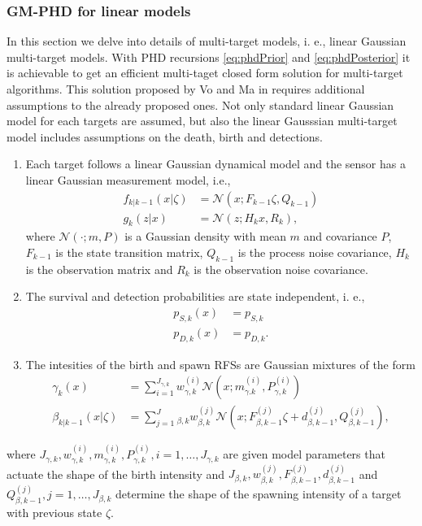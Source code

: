        \subsubsection{GM-PHD for linear models}
In this section we delve into details of multi-target models, i. e., linear Gaussian multi-target models. With PHD recursions \eqref{eq:phdPrior} and \eqref{eq:phdPosterior} it is achievable to get an efficient multi-taget closed form solution for multi-target algorithms. This solution proposed by Vo and Ma in \cite{VoMaPHD2006} requires additional assumptions to the already proposed ones. Not only standard linear Gaussian model for each targets are assumed, but also the linear Gausssian multi-target model includes assumptions on the death, birth and detections.
\begin{enumerate}[start=4]
    \item  Each target follows a linear Gaussian dynamical model and the sensor has a linear Gaussian measurement model, i.e., \label{as:phd_4}
        \begin{align}
            f_{k|k-1}(x|\zeta) &= \mathcal{N}(x; F_{k-1}\zeta, Q_{k-1}) \\
            g_k(z|x) &= \mathcal{N}(z;H_kx, R_k),
        \end{align}
        where $\mathcal{N}(\cdot;m,P)$ is a Gaussian density with mean $m$ and covariance $P$, $F_{k-1}$ is the state transition matrix, $Q_{k-1}$ is the process noise covariance, $H_k$ is the observation matrix and $R_k$ is the observation noise covariance.
    \item The survival and detection probabilities are state independent, i. e., \label{as:phd_5}
        \begin{align}
            p_{S,k}(x) &= p_{S,k} \\
            p_{D,k}(x) &= p_{D,k}.
        \end{align}
    \item The intesities of the birth and spawn RFSs are Gaussian mixtures of the form \label{as:phd_6}
        \begin{align}
            \gamma_k(x) &= \sum_{i=1}^{J_{\gamma,k}}w_{\gamma,k}^{(i)} \mathcal{N}(x; m_{\gamma.k}^{(i)}, P_{\gamma,k}^{(i)}) \label{eq:phd_birth_intensity} \\
            \beta_{k|k-1}(x|\zeta) &= \sum_{j=1}^J_{\beta,k} w_{\beta,k}^{(j)} \mathcal{N}(x;F_{\beta,k-1}^(j)\zeta + d_{\beta,k-1}^{(j)}, Q_{\beta,k-1}^{(j)}), \label{eq:phd_spawning_intensity}
        \end{align}
\end{enumerate}
where $J_{\gamma,k}, w_{\gamma,k}^{(i)}, m_{\gamma,k}^{(i)}, P_{\gamma,k}^{(i)}, i=1,\dots, J_{\gamma,k}$ are given model parameters that actuate the shape of the birth intensity and $J_{\beta,k}, w_{\beta,k}^{(j)}, F_{\beta,k-1}^{(j)}, d_{\beta,k-1}^{(j)}$ and $Q_{\beta,k-1}^{(j)}, j=1,\dots, J_{\beta,k}$ determine the shape of the spawning intensity of a target with previous state $\zeta$.

